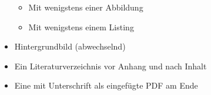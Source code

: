 \begin{itemize}
        \begin{itemize}                                                                         
            \item Mit wenigstens einer Abbildung                                                
            \item Mit wenigstens einem Listing                                                             
        \end{itemize}                                                                           
    \item Hintergrundbild (abwechselnd)                                            
    \item Ein Literaturverzeichnis vor Anhang und nach Inhalt
    \item Eine  mit Unterschrift als eingefügte PDF am Ende
\end{itemize}